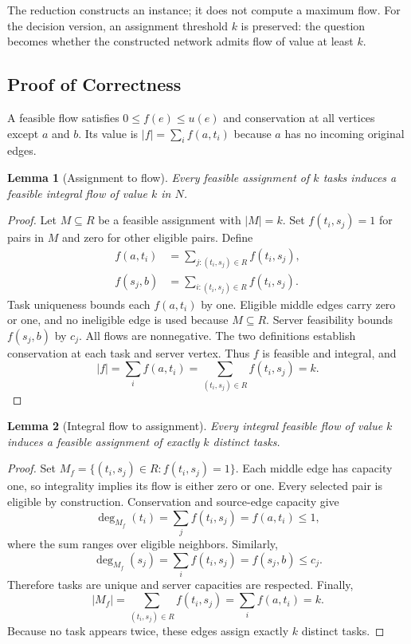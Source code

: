 \documentclass[conference]{IEEEtran}
\newtheorem{lemma}{Lemma}
\theoremstyle{definition}
\theoremstyle{remark}
\begin{document}
The reduction constructs an instance; it does not compute a maximum flow.
For the decision version, an assignment threshold $k$ is preserved: the
question becomes whether the constructed network admits flow of value at
least $k$.

\subsection{Proof of Correctness}
A feasible flow satisfies $0\leq f(e)\leq u(e)$ and conservation at all
vertices except $a$ and $b$. Its value is
$|f|=\sum_i f(a,t_i)$ because $a$ has no incoming original edges.

\begin{lemma}[Assignment to flow]
Every feasible assignment of $k$ tasks induces a feasible integral flow of
value $k$ in $N$.
\end{lemma}
\begin{proof}
Let $M\subseteq R$ be a feasible assignment with $|M|=k$. Set
$f(t_i,s_j)=1$ for pairs in $M$ and zero for other eligible pairs. Define
\begin{align}
f(a,t_i)&=\sum_{j:(t_i,s_j)\in R}f(t_i,s_j),\\
f(s_j,b)&=\sum_{i:(t_i,s_j)\in R}f(t_i,s_j).
\end{align}
Task uniqueness bounds each $f(a,t_i)$ by one. Eligible middle edges carry
zero or one, and no ineligible edge is used because $M\subseteq R$.
Server feasibility bounds $f(s_j,b)$ by $c_j$. All flows are nonnegative.
The two definitions establish conservation at each task and server vertex.
Thus $f$ is feasible and integral, and
\begin{equation}
|f|=\sum_i f(a,t_i)=\sum_{(t_i,s_j)\in R}f(t_i,s_j)=k.
\end{equation}
\end{proof}

\begin{lemma}[Integral flow to assignment]
Every integral feasible flow of value $k$ induces a feasible assignment of
exactly $k$ distinct tasks.
\end{lemma}
\begin{proof}
Set $M_f=\{(t_i,s_j)\in R:f(t_i,s_j)=1\}$. Each middle edge has capacity
one, so integrality implies its flow is either zero or one. Every selected
pair is eligible by construction. Conservation and source-edge capacity give
\begin{equation}
\deg_{M_f}(t_i)=\sum_j f(t_i,s_j)=f(a,t_i)\leq1,
\end{equation}
where the sum ranges over eligible neighbors. Similarly,
\begin{equation}
\deg_{M_f}(s_j)=\sum_i f(t_i,s_j)=f(s_j,b)\leq c_j.
\end{equation}
Therefore tasks are unique and server capacities are respected. Finally,
\begin{equation}
|M_f|=\sum_{(t_i,s_j)\in R}f(t_i,s_j)=\sum_i f(a,t_i)=k.
\end{equation}
Because no task appears twice, these edges assign exactly $k$ distinct tasks.
\end{proof}
\end{document}
